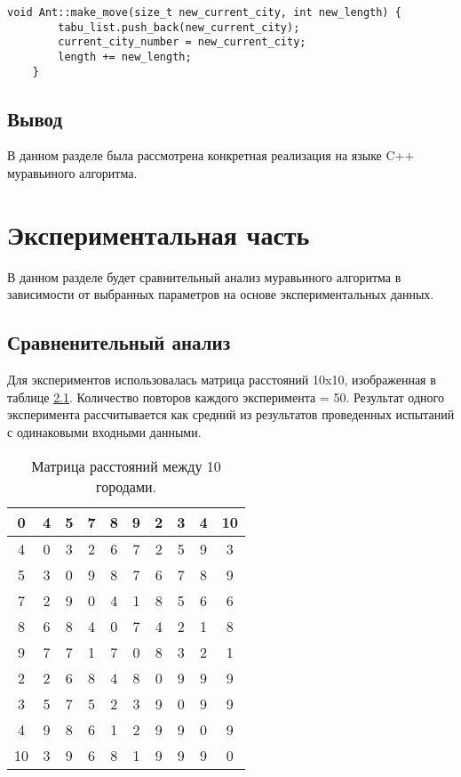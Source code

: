 \documentclass[12pt, a4paper]{report}
\begin{document}
    \begin{lstlisting}[label=code:ant_make_move,caption=Функция ant::make\_movе]
    void Ant::make_move(size_t new_current_city, int new_length) {
	    tabu_list.push_back(new_current_city);
	    current_city_number = new_current_city;
	    length += new_length;
    }
    \end{lstlisting}
    
    \section{Вывод}
    \hspace{0.5cm}В данном разделе была рассмотрена конкретная реализация на языке C++ муравьиного алгоритма.
    
    \chapter{Экспериментальная часть}
    \hspace{0.5cm}В данном разделе будет сравнительный анализ муравьиного алгоритма в зависимости от выбранных параметров на основе экспериментальных данных.
    \section {Сравненительный анализ}
    \hspace{0.5cm}Для экспериментов использовалась матрица расстояний 10x10, изображенная в таблице \ref{tab:matr_dist}. Количество повторов каждого эксперимента = 50. Результат одного эксперимента рассчитывается как средний из результатов проведенных испытаний с одинаковыми входными данными.
    
    \begin{table}[ht!]
    \centering
    	\begin{tabular}{ | c | c | c | c | c | c | c | c | c | c | }
    		\hline 0 & 4 & 5 & 7 & 8 & 9 & 2 & 3 & 4 & 10 \\
    		\hline 4 & 0 & 3 & 2 & 6 & 7 & 2 & 5 & 9 & 3 \\
    		\hline 5 & 3 & 0 & 9 & 8 & 7 & 6 & 7 & 8 & 9 \\
    		\hline 7 & 2 & 9 & 0 & 4 & 1 & 8 & 5 & 6 & 6 \\
    		\hline 8 & 6 & 8 & 4 & 0 & 7 & 4 & 2 & 1 & 8 \\
    		\hline 9 & 7 & 7 & 1 & 7 & 0 & 8 & 3 & 2 & 1 \\
    		\hline 2 & 2 & 6 & 8 & 4 & 8 & 0 & 9 & 9 & 9 \\
    		\hline 3 & 5 & 7 & 5 & 2 & 3 & 9 & 0 & 9 & 9 \\
    		\hline 4 & 9 & 8 & 6 & 1 & 2 & 9 & 9 & 0 & 9 \\
    		\hline 10 & 3 & 9 & 6 & 8 & 1 & 9 & 9 & 9 & 0 \\
    		\hline
    	\end{tabular}
    	\label{tab:matr_dist}
    		\caption{Матрица расстояний между 10 городами.}
    \end{table} 
    
\end{document}
